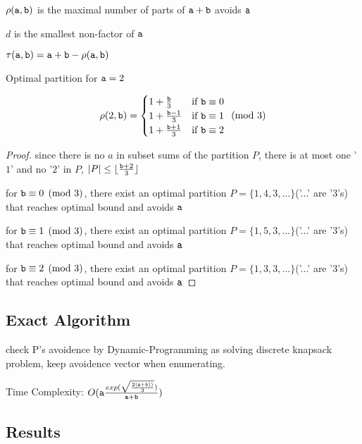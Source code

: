 \begin{definition}
$\rho(\mathtt{a},\mathtt{b})$ is the maximal number of parts of $\mathtt{a}+\mathtt{b}$ avoids $\mathtt{a}$

$d$ is the smallest non-factor of $\mathtt{a}$
\end{definition}

\begin{remark}
$\tau(\mathtt{a},\mathtt{b})=\mathtt{a}+\mathtt{b}-\rho(\mathtt{a},\mathtt{b})$
\end{remark}

\begin{theorem}
Optimal partition for $\mathtt{a}=2$

\[
 \rho(2,\mathtt{b}) =
   \begin{cases}
     1+\frac{\mathtt{b}}{3}   &\mbox{if }\mathtt{b}\equiv0\\
     1+\frac{\mathtt{b}-1}{3} &\mbox{if }\mathtt{b}\equiv1\\
     1+\frac{\mathtt{b}+1}{3} &\mbox{if }\mathtt{b}\equiv2
   \end{cases}
   \pmod{3}
\]
\end{theorem}

\begin{proof}
	since there is no $a$ in subset sums of the partition $P$, there is at most one '$1$' and no '$2$' in $P$, $|P|\leq \lfloor\frac{\mathtt{b}+2}{3}\rfloor$

	for $\mathtt{b}\equiv0\pmod{3}$, there exist an optimal partition $P=\{1,4,3,...\}$('...' are '$3$'s) that reaches optimal bound and avoids $\mathtt{a}$

	for $\mathtt{b}\equiv1\pmod{3}$, there exist an optimal partition $P=\{1,5,3,...\}$('...' are '$3$'s) that reaches optimal bound and avoids $\mathtt{a}$

	for $\mathtt{b}\equiv2\pmod{3}$, there exist an optimal partition $P=\{1,3,3,...\}$('...' are '$3$'s) that reaches optimal bound and avoids $\mathtt{a}$

\end{proof}


\subsection{Exact Algorithm}

\begin{algorithmic}
     
    \ENDIF
  \ENDFOR
\end{algorithmic}
check P's avoidence by Dynamic-Programming as solving discrete knapsack problem, keep avoidence vector when enumerating.

Time Complexity: $O(\mathtt{a}\frac{exp(\sqrt{\frac{2(\mathtt{a}+\mathtt{b}))}{3} } )}{\mathtt{a}+\mathtt{b}})$

\subsection{Results}

